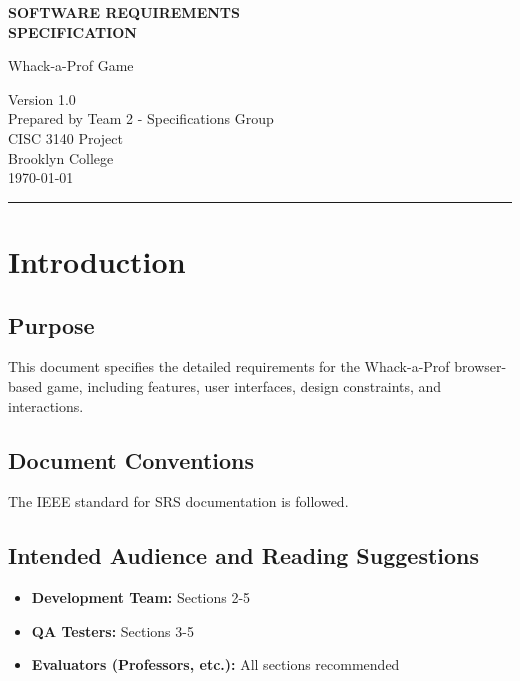 \documentclass{scrreprt}
\date{\today}
\def\myversion{1.0}
\begin{document}
\begin{titlepage}
    \centering
    {\Huge\bfseries SOFTWARE REQUIREMENTS\\ SPECIFICATION \par}
    \vspace{1.5cm}
    {\LARGE Whack-a-Prof Game\par}
    \vfill
    {\Large Version \myversion\\}
    \vspace{1cm}
    {\large Prepared by Team 2 - Specifications Group\\}
    {\large CISC 3140 Project\\}
    {\large Brooklyn College\\}
    {\large \today\\}
    \vfill
    \rule{\linewidth}{0.5mm}
\end{titlepage}


\tableofcontents
\newpage

\chapter{Introduction}

\section{Purpose}
This document specifies the detailed requirements for the Whack-a-Prof browser-based game, including features, user interfaces, design constraints, and interactions.

\section{Document Conventions}
The IEEE standard for SRS documentation is followed.

\section{Intended Audience and Reading Suggestions}
\begin{itemize}
    \item \textbf{Development Team:} Sections 2-5
    \item \textbf{QA Testers:} Sections 3-5
    \item \textbf{Evaluators (Professors, etc.):} All sections recommended
\end{itemize}
\end{document}
